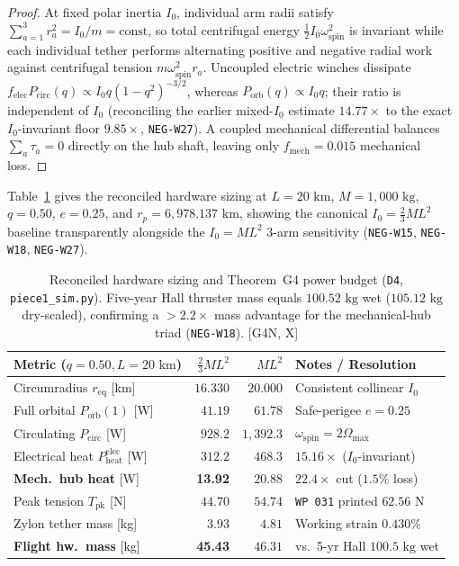 \documentclass[11pt]{amsart}
\numberwithin{equation}{section}
\theoremstyle{plain}
\theoremstyle{definition}\newtheorem{definition}[theorem]{Definition}
\theoremstyle{remark}\newtheorem{remark}[theorem]{Remark}
\newcommand{\ctag}[1]{\textup{\textsf{\scriptsize[#1]}}}
\begin{document}
\begin{proof}
At fixed polar inertia $I_0$, individual arm radii satisfy $\sum_{a=1}^3 r_a^2 = I_0/m = \mathrm{const}$, so total centrifugal energy $\frac12 I_0 \omega_{\mathrm{spin}}^2$ is invariant while each individual tether performs alternating positive and negative radial work against centrifugal tension $m \omega_{\mathrm{spin}}^2 r_a$. Uncoupled electric winches dissipate $f_{\mathrm{elec}} P_{\mathrm{circ}}(q) \propto I_0 q (1-q^2)^{-3/2}$, whereas $P_{\mathrm{orb}}(q) \propto I_0 q$; their ratio is independent of $I_0$ (reconciling the earlier mixed-$I_0$ estimate $14.77\times$ to the exact $I_0$-invariant floor $9.85\times$, \texttt{NEG-W27}). A coupled mechanical differential balances $\sum_a \tau_a = 0$ directly on the hub shaft, leaving only $f_{\mathrm{mech}} = 0.015$ mechanical loss.
\end{proof}

Table~\ref{tab:G4} gives the reconciled hardware sizing at $L = 20\text{ km}$, $M = 1{,}000\text{ kg}$, $q = 0.50$, $e = 0.25$, and $r_p = 6{,}978.137\text{ km}$, showing the canonical $I_0 = \frac23 ML^2$ baseline transparently alongside the $I_0 = ML^2$ 3-arm sensitivity (\texttt{NEG-W15}, \texttt{NEG-W18}, \texttt{NEG-W27}).

\begin{table}[htbp]\centering\scriptsize\setlength{\tabcolsep}{2.8pt}
\begin{tabular}{lrrl}\toprule
Metric ($q{=}0.50, L{=}20\text{ km}$) & $\frac23 ML^2$ & $ML^2$ & Notes / Resolution \\\midrule
Circumradius $r_{\mathrm{eq}}$ [km] & $16.330$ & $20.000$ & Consistent collinear $I_0$ \\
Full orbital $P_{\mathrm{orb}}(1)$ [W] & $41.19$ & $61.78$ & Safe-perigee $e=0.25$ \\
Circulating $P_{\mathrm{circ}}$ [W] & $928.2$ & $1{,}392.3$ & $\omega_{\mathrm{spin}} = 2\Omega_{\max}$ \\
Electrical heat $P_{\mathrm{heat}}^{\mathrm{elec}}$ [W] & $312.2$ & $468.3$ & $15.16\times$ ($I_0$-invariant) \\
\textbf{Mech.\ hub heat} [W] & \textbf{13.92} & $20.88$ & $22.4\times$ cut ($1.5\%$ loss) \\
Peak tension $T_{\mathrm{pk}}$ [N] & $44.70$ & $54.74$ & \texttt{WP~031} printed $62.56\text{ N}$ \\
Zylon tether mass [kg] & $3.93$ & $4.81$ & Working strain $0.430\%$ \\
\textbf{Flight hw.\ mass} [kg] & \textbf{45.43} & $46.31$ & vs.\ 5-yr Hall $100.5\text{ kg}$ wet \\\bottomrule
\end{tabular}
\caption{Reconciled hardware sizing and Theorem~G4 power budget (\texttt{D4}, \texttt{piece1\_sim.py}). Five-year Hall thruster mass equals $100.52\text{ kg}$ wet ($105.12\text{ kg}$ dry-scaled), confirming a $>2.2\times$ mass advantage for the mechanical-hub triad (\texttt{NEG-W18}). \ctag{G4N, X}}\label{tab:G4}
\end{table}
\end{document}
